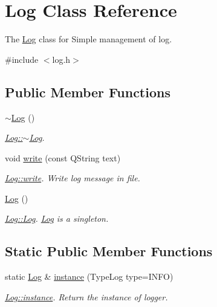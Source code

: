 \hypertarget{classLog}{\section{Log Class Reference}
\label{classLog}
}


The \hyperlink{classLog}{Log} class for Simple management of log.  




{\ttfamily \#include $<$log.\-h$>$}

\subsection*{Public Member Functions}
\begin{DoxyCompactItemize}
\item 
\hypertarget{classLog_a0fbfda88fbee5027c89f6eb121059360}{\hyperlink{classLog_a0fbfda88fbee5027c89f6eb121059360}{$\sim$\-Log} ()}\label{classLog_a0fbfda88fbee5027c89f6eb121059360}

\begin{DoxyCompactList}\small\item\em \hyperlink{classLog_a0fbfda88fbee5027c89f6eb121059360}{Log\-::$\sim$\-Log}. \end{DoxyCompactList}\item 
void \hyperlink{classLog_acef079f691840d7afd2ed9482d5d66ea}{write} (const Q\-String text)
\begin{DoxyCompactList}\small\item\em \hyperlink{classLog_acef079f691840d7afd2ed9482d5d66ea}{Log\-::write}. Write log message in file. \end{DoxyCompactList}\item 
\hypertarget{classLog_af6071a60aa52b6c1b511f99b4bc1b8fe}{\hyperlink{classLog_af6071a60aa52b6c1b511f99b4bc1b8fe}{Log} ()}\label{classLog_af6071a60aa52b6c1b511f99b4bc1b8fe}

\begin{DoxyCompactList}\small\item\em \hyperlink{classLog_af6071a60aa52b6c1b511f99b4bc1b8fe}{Log\-::\-Log}. \hyperlink{classLog}{Log} is a singleton. \end{DoxyCompactList}\end{DoxyCompactItemize}
\subsection*{Static Public Member Functions}
\begin{DoxyCompactItemize}
\item 
static \hyperlink{classLog}{Log} \& \hyperlink{classLog_ad8ef93302c147f832ed8202a6b039eb5}{instance} (Type\-Log type=I\-N\-F\-O)
\begin{DoxyCompactList}\small\item\em \hyperlink{classLog_ad8ef93302c147f832ed8202a6b039eb5}{Log\-::instance}. Return the instance of logger. \end{DoxyCompactList}\end{DoxyCompactItemize}
